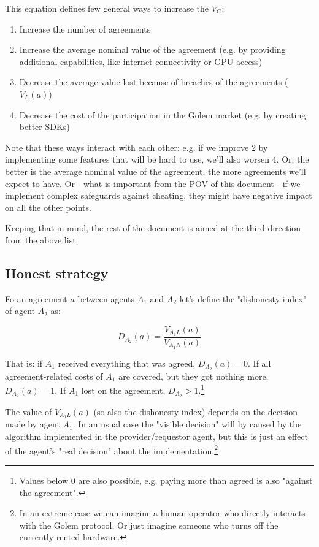 \documentclass{article}
\begin{document}
This equation defines few general ways to increase the $V_G$:

\begin{enumerate}
\item Increase the number of agreements
\item Increase the average nominal value of the agreement (e.g. by providing additional capabilities, like internet connectivity or GPU access)
\item Decrease the average value lost because of breaches of the agreements ($V_L(a)$)
\item Decrease the cost of the participation in the Golem market (e.g. by creating better SDKs)
\end{enumerate}

Note that these ways interact with each other: e.g. if we improve 2 by implementing some features that will be hard to use, we'll also worsen 4.
Or: the better is the average nominal value of the agreement, the more agreements we'll expect to have.
Or - what is important from the POV of this document - if we implement complex safeguards against cheating, they might have negative impact on all the other points.

Keeping that in mind, the rest of the document is aimed at the third direction from the above list.

\subsection{Honest strategy}

Fo an agreement $a$ between agents $A_1$ and $A_2$ let's define the "dishonesty index" of agent $A_2$ as:

\begin{equation}
    D_{A_2}(a) = \frac{V_{A_1L}(a)}{V_{A_1N}(a)}
\end{equation}

 
That is: if $A_1$ received everything that was agreed, $D_{A_2}(a) = 0$. If all agreement-related costs of $A_1$ are covered, but they got nothing more, $D_{A_2}(a) = 1$.
If $A_1$ lost on the agreement, $D_{A_2} > 1$.\footnote{Values below 0 are also possible, e.g. paying more than agreed is also "against the agreement".}

The value of $V_{A_1L}(a)$ (so also the dishonesty index) depends on the decision made by agent $A_1$. 
In an usual case the "visible decision" will by caused by the algorithm implemented in the provider/requestor agent,
but this is just an effect of the agent's "real decision" about the implementation.\footnote{In an extreme case we can imagine 
a human operator who directly interacts with the Golem protocol. Or just imagine someone who turns off the currently rented hardware.}
\end{document}
